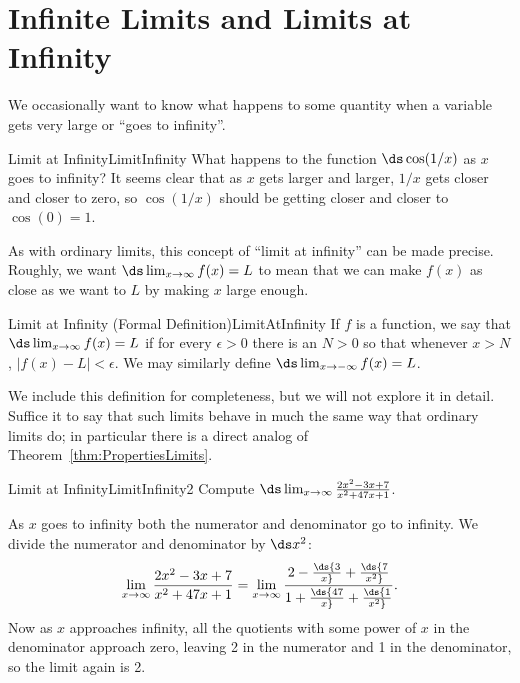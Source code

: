 \section{Infinite Limits and Limits at Infinity}\label{sec:InfLimits}
We occasionally want to know what happens to some quantity
when a variable gets very large or ``goes to infinity''.

\begin{example}{Limit at Infinity}{LimitInfinity}
What happens to the function $\ds \cos(1/x)$ as $x$ goes to infinity? It
seems clear that as $x$ gets larger and larger, $1/x$ gets closer and
closer to zero, so $\cos(1/x)$ should be getting closer and closer to 
$\cos(0)=1$.
\end{example}

As with ordinary limits, this concept of ``limit at infinity'' can be
made precise. Roughly, we want $\ds \lim_{x\to \infty}f(x)=L$ to mean that
we can make $f(x)$ as close as we want to $L$ by making $x$ large
enough.

\begin{definition}{Limit at Infinity (Formal Definition)}{LimitAtInfinity}
If $f$ is a function, we say that $\ds \lim_{x\to
  \infty}f(x)=L$ if for every $\epsilon>0$ there is an $N > 0$ so that
  whenever $x>N$, $|f(x)-L|<\epsilon$.
We may similarly define $\ds \lim_{x\to-\infty}f(x)=L$.
\end{definition}

We include this definition for completeness, but we will not explore it in
detail. Suffice it to say that such limits behave in much the same way
that ordinary limits do; in particular there is a direct analog of 
Theorem~\ref{thm:PropertiesLimits}.

\begin{example}{Limit at Infinity}{LimitInfinity2}
Compute $\ds\lim_{x\to \infty}{2x^2-3x+7\over x^2+47x+1}$.
\end{example}

\begin{solution} 
As $x$ goes to infinity both the numerator and denominator go to
infinity. We divide the numerator and
denominator by $\ds x^2$:
$$\lim_{x\to \infty}{2x^2-3x+7\over x^2+47x+1}=
\lim_{x\to \infty}{2-\ds{3\over x}+\ds{7\over x^2}\over
1+\ds{47\over x}+\ds{1\over x^2}}.$$
Now as $x$ approaches infinity, all the quotients with some power of
$x$ in the denominator approach zero, leaving 2 in the numerator and 1
in the denominator, so the limit again is 2.
\end{solution}

